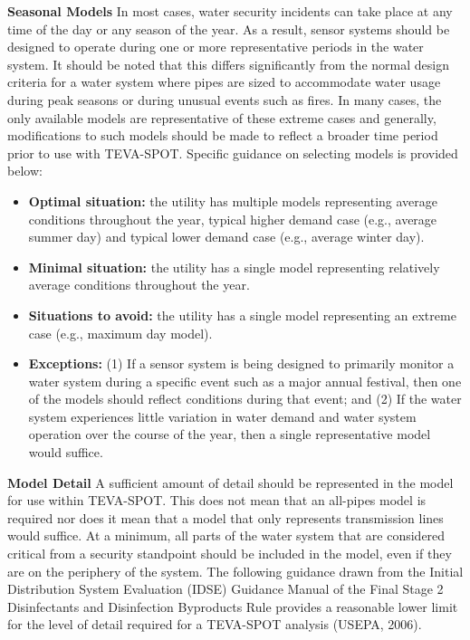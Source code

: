 {\bf Seasonal Models} 
In most cases, water security incidents can take place at any time of the day or any season of the year. As a result, sensor systems should be designed to operate during one or more representative periods in the water system. It should be noted that this differs significantly from the normal design criteria for a water system where pipes are sized to accommodate water usage during peak seasons or during unusual events such as fires. In many cases, the only available models are representative of these extreme cases and generally, modifications to such models should be made to reflect a broader time period prior to use with TEVA-SPOT. Specific guidance on selecting models is provided below:
\begin{itemize} 
\item {\bfseries Optimal situation:} the utility has multiple models representing average conditions throughout the year, typical higher demand case (e.g., average summer day) and typical lower demand case (e.g., average winter day).
\item {\bfseries Minimal situation:} the utility has a single model representing relatively average conditions throughout the year.
\item {\bfseries Situations to avoid:} the utility has a single model representing an extreme case (e.g., maximum day model). 
\item {\bfseries Exceptions:} (1) If a sensor system is being designed to primarily monitor a water system during a specific event such as a major annual festival, then one of the models should reflect conditions during that event; and (2) If the water system experiences little variation in water demand and water system operation over the course of the year, then a single representative model would suffice.
\end{itemize} 

{\bf Model Detail}
A sufficient amount of detail should be represented in the model for use within TEVA-SPOT. This does not mean that an all-pipes model is required nor does it mean that a model that only represents transmission lines would suffice. At a minimum, all parts of the water system that are considered critical from a security standpoint should be included in the model, even if they are on the periphery of the system. The following guidance drawn from the Initial Distribution System Evaluation (IDSE) Guidance Manual of the Final Stage 2 Disinfectants and Disinfection Byproducts Rule provides a reasonable lower limit for the level of detail required for a TEVA-SPOT analysis (USEPA, 2006). 

